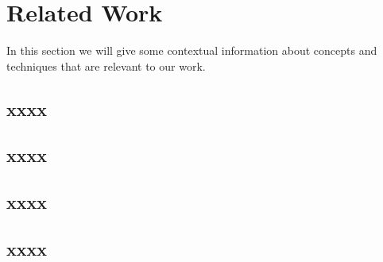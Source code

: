 
\section{Related Work}
\label{sec:RelatedWork}

In this section we will give some contextual information about concepts and techniques that are relevant to our work.


\subsection{xxxx}
\label{subsec:xxxxx}



\subsection{xxxx}
\label{subsec:xxxxxx}



\subsection{xxxx}
\label{subsec:xxxxxx}



\subsection{xxxx}
\label{subsec:xxxxxx}